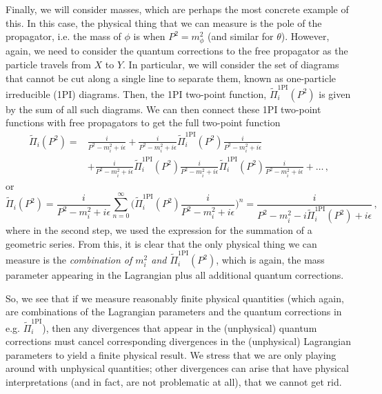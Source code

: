 \documentclass{article}
\newcommand{\td}[1]{\tilde{#1}}
\numberwithin{equation}{subsection}
\begin{document}
Finally, we will consider masses, which are perhaps the most concrete example of this. In this case, the physical thing that we can measure is the pole of the propagator, i.e. the mass 
of $\phi$ is when $P^2 = m_\phi^2$ (and similar for $\theta$). However, again, we need to consider the quantum corrections to the free propagator as the particle travels from $X$ to $Y$. 
In particular, we will consider the set of diagrams that cannot be cut along a single line to separate them, known as one-particle irreducible (1PI) diagrams. Then, the 1PI two-point function, 
$\td\Pi_i^{\text{1PI}}(P^2)$ is given by the sum of all such diagrams. We can then connect these 1PI two-point functions with free propagators to get the full two-point function
\begin{equation}\begin{split}
    \td\Pi_i(P^2) =& \frac{i}{P^2 - m_i^2 + i\epsilon} + \frac{i}{P^2-m_i^2 + i\epsilon}\td\Pi_i^{\text{1PI}}(P^2)\frac{i}{P^2-m_i^2 + i\epsilon}\\[0.5em]
    &+ \frac{i}{P^2-m_i^2+ i\epsilon}\td\Pi_i^{\text{1PI}}(P^2)\frac{i}{P^2-m_i^2 + i\epsilon}\td\Pi_i^{\text{1PI}}(P^2)\frac{i}{P^2-m_i^2 + i\epsilon} + \dots\,,
\end{split}\end{equation}
or
\begin{equation}\label{eq:resumProp}
    \td\Pi_i(P^2) = \frac{i}{P^2 - m_i^2 + i\epsilon}\sum_{n=0}^\infty \Bigg(\td\Pi_i^{\text{1PI}}(P^2)\frac{i}{P^2-m_i^2 + i\epsilon}\Bigg)^n =
	\frac{i}{P^2 - m_i^2 - i\td\Pi_i^{\text{1PI}}(P^2) + i\epsilon} \,,
\end{equation}
where in the second step, we used the expression for the summation of a geometric series. From this, it is clear that the only physical thing we can measure is the 
\textit{combination of $m_i^2$ and $\td\Pi_i^\text{1PI}(P^2)$}, which is again, the mass parameter appearing in the Lagrangian plus all additional quantum corrections.

So, we see that if we measure reasonably finite physical quantities (which again, are combinations of the Lagrangian parameters and the quantum corrections in e.g. $\td\Pi_i^{\text{1PI}}$), 
then any divergences that appear in the (unphysical) quantum corrections must cancel corresponding divergences in the (unphysical) Lagrangian parameters to yield a finite physical result. 
We stress that we are only playing around with unphysical quantities; other divergences can arise that have physical interpretations (and in fact, are not problematic at all), that we cannot get rid.
\end{document}
